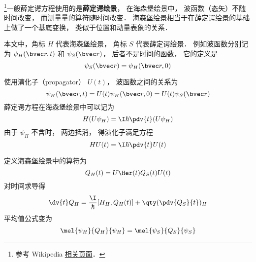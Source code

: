 
\begin{issues}
\issueDraft
\end{issues}


\footnote{参考 Wikipedia \href{https://en.wikipedia.org/wiki/Heisenberg_picture}{相关页面}．}一般薛定谔方程使用的是\textbf{薛定谔绘景}， 在海森堡绘景中， 波函数（态矢）不随时间改变， 而测量量的算符随时间改变． 海森堡绘景相当于在薛定谔绘景的基础上做了一个基底变换， 类似于位置和动量表象的关系．

本文中，角标 $H$ 代表海森堡绘景， 角标 $S$ 代表薛定谔绘景． 例如波函数分别记为 $\psi_H(\bvec r, t)$ 和 $\psi_S(\bvec r)$， 后者不是时间的函数， 它的定义是
\begin{equation}
\psi_S(\bvec r) = \psi_H(\bvec r, 0)
\end{equation}


使用演化子（propagator） $U(t)$， 波函数之间的关系为
\begin{equation}
\psi_H(\bvec r, t) = U(t) \psi_H(\bvec r, 0) = U(t) \psi_S(\bvec r)
\end{equation}
薛定谔方程在海森堡绘景中可以记为
\begin{equation}
H(U\psi_H) = \I\hbar \pdv{t} (U\psi_H)
\end{equation}
由于 $\psi_H$ 不含时， 两边抵消， 得演化子满足方程
\begin{equation}
H U(t) = \I\hbar \pdv{t} U(t)
\end{equation}

定义海森堡绘景中的算符为
\begin{equation}
Q_H(t) = U\Her(t) Q_S(t) U(t)
\end{equation}
对时间求导得
\begin{equation}
\dv{t}Q_H = \frac{\I}{\hbar} [H_H, Q_H(t)] + \qty(\pdv{Q_S}{t})_H
\end{equation}
平均值公式变为
\begin{equation}
\mel{\psi_H}{Q_H}{\psi_H} = \mel{\psi_S}{Q_S}{\psi_S}
\end{equation}
